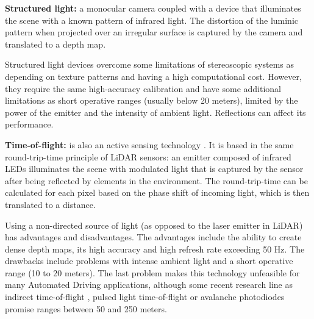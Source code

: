     
    
\textbf{Structured light:} a monocular camera coupled with a device that
illuminates the scene with a known pattern of infrared light. 
The distortion of the luminic pattern when projected over an irregular 
surface is captured by the camera and translated to a depth map.

Structured light devices overcome some limitations of stereoscopic systems
as depending on texture patterns and having a high computational cost. 
However, they require the same high-accuracy calibration \cite{Garbat2013}
and have some additional limitations as short operative ranges (usually 
below 20 meters), limited by the power of the emitter and the intensity of 
ambient light. Reflections can affect its performance.


\textbf{Time-of-flight:} is also an active sensing technology 
\cite{Hansard2013}. It is based in the same round-trip-time principle 
of LiDAR sensors: an emitter composed of infrared LEDs illuminates the scene
with modulated light that is captured by the sensor after being reflected by 
elements in the environment. 
The round-trip-time can be calculated for each pixel based on the phase shift 
of incoming light, which is then translated to a distance.

Using a non-directed source of light (as opposed to the laser emitter in 
LiDAR) has advantages and disadvantages. 
The advantages include the ability to create dense depth maps, its high 
accuracy and high refresh rate exceeding 50 Hz. The drawbacks include 
problems with intense ambient light and a short operative range (10 to 20 
meters). The last problem makes this technology unfeasible for many Automated 
Driving applications, although some recent research line as indirect 
time-of-flight \cite{Villa2017}, pulsed light time-of-flight or avalanche 
photodiodes \cite{Panasonic2018} promise ranges between 50 and 250 meters.
    



